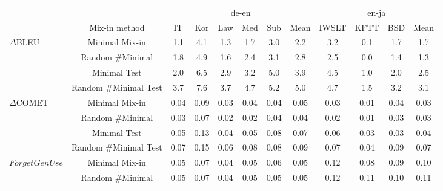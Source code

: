 \documentclass[11pt]{article}
\begin{document}
\begin{table*}[h!]
    \centering
   \small 
    \begin{tabular}{p{1.8cm}c| ccccc|c| ccc|c}
    & &  \multicolumn{6}{c|}{de-en} &  \multicolumn{4}{c}{en-ja}\\
  &  Mix-in method     & IT & Kor &Law &Med  & Sub & Mean &  IWSLT  &KFTT &BSD & Mean \\
             \hline

  \multirow{4}{*}{$\Delta$BLEU}    &    Minimal Mix-in & 1.1 &4.1 & 1.3 & 1.7  &3.0 & 2.2 & 3.2  & 0.1 & 1.7& 1.7\\
&        Random \#Minimal &1.8 & 4.9  &1.6  &2.4 & 3.1 & 2.8  &2.5  & 0.0 & 1.4& 1.3\\
  & Minimal Test &2.0  & 6.5 & 2.9  & 3.2  & 5.0 &   3.9  & 4.5 & 1.0 & 2.0 & 2.5\\
   &    Random \#Minimal Test  &3.7  & 7.6 & 3.7 & 4.7& 5.2 & 5.0 & 4.7  & 1.5 &3.2 &3.1   \\
 \hline

  \multirow{4}{*}{$\Delta$COMET}   &     Minimal Mix-in & 0.04 & 0.09  & 0.03 & 0.04 & 0.04 & 0.05 & 0.03 & 0.01 & 0.04 & 0.03  \\
   &    Random \#Minimal & 0.03& 0.07 & 0.02 & 0.02 & 0.04 & 0.04  & 0.02& 0.01 &0.03 & 0.03  \\
   &    Minimal  Test &0.05 & 0.13 & 0.04& 0.05& 0.08 & 0.07 & 0.06  & 0.03&  0.03& 0.04 \\
&     Random \#Minimal Test & 0.07&0.15  & 0.06& 0.08& 0.08 &0.09 & 0.07  &0.04 & 0.09 & 0.07\\

\hline
    \multirow{4}{*}{$ForgetGenUse$}    & Minimal Mix-in & 0.05 & 0.07 & 0.04 & 0.05 & 0.06  & 0.05  &  0.12 & 0.08& 0.09& 0.10  \\
      &  Random \#Minimal &0.05 &0.07  & 0.04 & 0.05& 0.05 & 0.05 &   0.12 &  0.11 & 0.10 & 0.11 \\


\end{tabular}
\end{table*}
\end{document}

